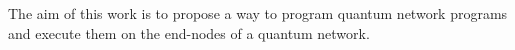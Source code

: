 


The aim of this work is to propose a way to program quantum network programs
and execute them on the end-nodes of a quantum network.


